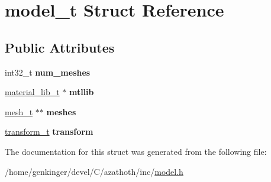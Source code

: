 \hypertarget{structmodel__t}{}\section{model\+\_\+t Struct Reference}
\label{structmodel__t}
\subsection*{Public Attributes}
\begin{DoxyCompactItemize}
\item 
\mbox{\label{structmodel__t_a3919e88c8f93e362a0efe3f303aedc5b}} 
int32\+\_\+t {\bfseries num\+\_\+meshes}
\item 
\mbox{\label{structmodel__t_ae374abb01c41eeeb7fe6e20b1ed7bcf3}} 
\mbox{\hyperlink{structmaterial__lib__t}{material\+\_\+lib\+\_\+t}} $\ast$ {\bfseries mtllib}
\item 
\mbox{\label{structmodel__t_aac7a6a825743bceaf68cb86c227fcc6e}} 
\mbox{\hyperlink{structmesh__t}{mesh\+\_\+t}} $\ast$$\ast$ {\bfseries meshes}
\item 
\mbox{\label{structmodel__t_a5aae1d0a6286cc05b66b8c8112d67483}} 
\mbox{\hyperlink{structtransform__t}{transform\+\_\+t}} {\bfseries transform}
\end{DoxyCompactItemize}


The documentation for this struct was generated from the following file\+:\begin{DoxyCompactItemize}
\item 
/home/genkinger/devel/\+C/azathoth/inc/\mbox{\hyperlink{model_8h}{model.\+h}}\end{DoxyCompactItemize}
